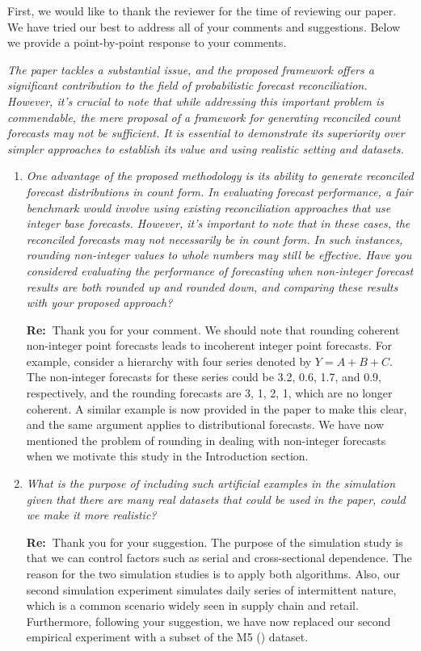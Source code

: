 \documentclass[11pt,a4paper]{article}
\newcommand{\RE}[2][Re:~]{{\color{blue}\textbf{#1}#2}}
\begin{document}
\RE[]{First, we would like to thank the reviewer for the time of reviewing our paper. We have tried our best to address all of your comments and suggestions. Below we provide a point-by-point response to your comments.}


\textit{The paper tackles a substantial issue, and the proposed framework offers a significant contribution to the field of probabilistic forecast reconciliation. However, it's crucial to note that while addressing this important problem is commendable, the mere proposal of a framework for generating reconciled count forecasts may not be sufficient. It is essential to demonstrate its superiority over simpler approaches to establish its value and using realistic setting and datasets.}

\begin{enumerate}
  \item \textit{One advantage of the proposed methodology is its ability to generate reconciled forecast distributions in count form. In evaluating forecast performance, a fair benchmark would involve using existing reconciliation approaches that use integer base forecasts. However, it's important to note that in these cases, the reconciled forecasts may not necessarily be in count form. In such instances, rounding non-integer values to whole numbers may still be effective. Have you considered evaluating the performance of forecasting when non-integer forecast results are both rounded up and rounded down, and comparing these results with your proposed approach?}

  \RE{Thank you for your comment. We should note that rounding coherent non-integer point forecasts leads to incoherent integer point forecasts. For example, consider a hierarchy with four series denoted by $Y=A+B+C$. The non-integer forecasts for these series could be 3.2, 0.6, 1.7, and 0.9, respectively, and the rounding forecasts are 3, 1, 2, 1, which are no longer coherent. A similar example is now provided in the paper to make this clear, and the same argument applies to distributional forecasts. We have now mentioned the problem of rounding in dealing with non-integer forecasts when we motivate this study in the Introduction section.}


  \item \textit{What is the purpose of including such artificial examples in the simulation given that there are many real datasets that could be used in the paper, could we make it more realistic?}

  \RE{Thank you for your suggestion. The purpose of the simulation study is that we can control factors such as serial and cross-sectional dependence. The reason for the two simulation studies is to apply both algorithms. Also, our second simulation experiment simulates daily series of intermittent nature, which is a common scenario widely seen in supply chain and retail. Furthermore, following your suggestion, we have now replaced our second empirical experiment with a subset of the M5 (\citealp{makridakisM5AccuracyCompetition2022}) dataset.}


\end{enumerate}
\end{document}
